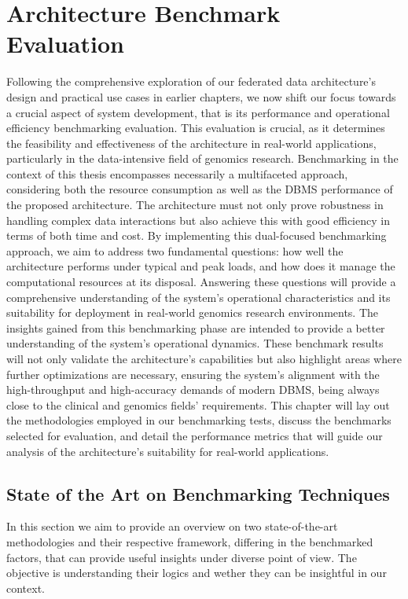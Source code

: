 
\chapter{Architecture Benchmark Evaluation}
\label{chp:evaluation}

Following the comprehensive exploration of our federated data architecture's design and practical use cases in earlier chapters, we now shift our focus towards a crucial aspect of system development, that is its performance and operational efficiency benchmarking evaluation. This evaluation is crucial, as it determines the feasibility and effectiveness of the architecture in real-world applications, particularly in the data-intensive field of genomics research.
Benchmarking in the context of this thesis encompasses necessarily a multifaceted approach, considering both the resource consumption as well as the \ac{DBMS} performance of the proposed architecture. The architecture must not only prove robustness in handling complex data interactions but also achieve this with good efficiency in terms of both time and cost.
By implementing this dual-focused benchmarking approach, we aim to address two fundamental questions: how well the architecture performs under typical and peak loads, and how does it manage the computational resources at its disposal. Answering these questions will provide a comprehensive understanding of the system's operational characteristics and its suitability for deployment in real-world genomics research environments.
The insights gained from this benchmarking phase are intended to provide a better understanding of the system's operational dynamics. These benchmark results will not only validate the architecture's capabilities but also highlight areas where further optimizations are necessary, ensuring the system's alignment with the high-throughput and high-accuracy demands of modern \ac{DBMS}, being always close to the clinical and genomics fields' requirements. This chapter will lay out the methodologies employed in our benchmarking tests, discuss the benchmarks selected for evaluation, and detail the performance metrics that will guide our analysis of the architecture's suitability for real-world applications.

\section{State of the Art on Benchmarking Techniques}
In this section we aim to provide an overview on two state-of-the-art methodologies and their respective framework, differing in the benchmarked factors, that can provide useful insights under diverse point of view. The objective is understanding their logics and wether they can be insightful in our context.
